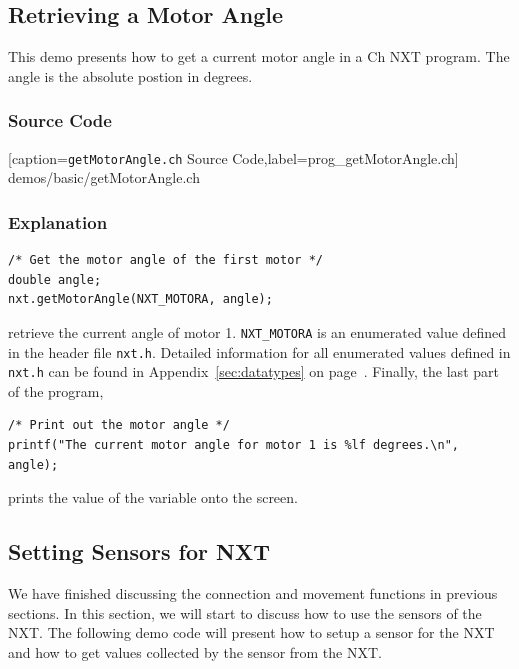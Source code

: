 \documentclass[11pt]{article}
\begin{document}
\subsection{Retrieving a Motor Angle}
This demo presents how to get a current motor angle in a Ch NXT program. The 
angle is the absolute postion in degrees.

\subsubsection*{Source Code}

[caption={{\tt getMotorAngle.ch} Source Code},label=prog_getMotorAngle.ch]
{demos/basic/getMotorAngle.ch}

\subsubsection*{Explanation}

\begin{lstlisting}
/* Get the motor angle of the first motor */
double angle;
nxt.getMotorAngle(NXT_MOTORA, angle);
\end{lstlisting}
retrieve the current angle of motor 1. {\tt NXT\_MOTORA} is an enumerated 
value defined in the header file {\tt nxt.h}. Detailed information for all 
enumerated values defined in {\tt nxt.h} can be found in 
Appendix~\ref{sec:datatypes} on page~\pageref{sec:datatypes}. Finally, the 
last part of the program,
\begin{lstlisting}
/* Print out the motor angle */
printf("The current motor angle for motor 1 is %lf degrees.\n", angle);
\end{lstlisting}
prints the value of the variable onto the screen.

\subsection{\label{setSensor_demo}Setting Sensors for NXT}
We have finished discussing the connection and movement functions in previous 
sections. In this section, we will start to discuss how to use the sensors of 
the NXT. The following demo code will present how to setup a sensor for the NXT 
and how to get values collected by the sensor from the NXT.
\end{document}
